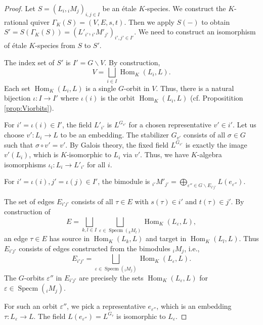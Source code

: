 \documentclass[a4paper,12pt,reqno]{amsart}
\DeclareMathOperator{\Specm}{\mathrm{Specm}}
\DeclareMathOperator{\Hom}{\mathrm{Hom}}
\theoremstyle{plain}
\theoremstyle{remark}
\begin{document}
\begin{proof}
    \smallskip
Let $S=(L_i, {}_iM_j)_{i,j\in I}$ be an \'etale $K$-species. We construct the $K$-rational quiver $\Gamma_K(S)=(V,E,s,t)$. Then we apply $S(-)$ to obtain $S' = S(\Gamma_K(S))=(L'_{i'},{}_{i'}M'_{j'})_{i',j'\in I'}$. We need to construct an isomorphism of \'etale $K$-species from $S$ to $S'$.

    \smallskip
     The index set of $S'$ is $I' = G\backslash V$. By construction,
    \[
    V=\bigsqcup\limits_{i\in I}\Hom_K(L_i,L).
    \]
    Each set $\Hom_K(L_i,L)$ is a single $G$-orbit in $V$. Thus, there is a natural bijection $\iota\colon I \to I'$ where $\iota(i)$ is the orbit $\Hom_K(L_i,L)$ (cf. Propositition \ref{prop:Viorbits}).

    \smallskip
     For $i'=\iota(i)\in I'$, the field $L'_{i'}$ is $L^{G_{v'}}$ for a chosen representative $v' \in i'$. Let us choose $v'\colon L_i \to L$ to be an embedding. The stabilizer $G_{v'}$ consists of all $\sigma\in G$ such that $\sigma\circ v' = v'$. By Galois theory, the fixed field $L^{G_{v'}}$ is exactly the image $v'(L_i)$, which is $K$-isomorphic to $L_i$ via $v'$. Thus, we have $K$-algebra isomorphisms $\iota_i\colon L_i \to L'_{i'}$ for all $i$.

    \smallskip
     For $i'=\iota(i), j'=\iota(j) \in I'$, the bimodule is ${}_{i'}M'_{j'} = \bigoplus_{\varepsilon'' \in G\backslash E_{i'j'}} L(e_{\varepsilon''})$.
    
    The set of edges $E_{i'j'}$ consists of all $\tau\in E$ with $s(\tau)\in i'$ and $t(\tau)\in j'$. By construction of
    \[
    E = \bigsqcup\limits_{k,l\in I}\bigsqcup\limits_{\varepsilon\in\Specm({}_kM_l)}\Hom_K(L_\varepsilon,L),
    \]
    an edge $\tau\in E$ has source in $\Hom_K(L_k,L)$ and target in $\Hom_K(L_l,L)$. Thus $E_{i'j'}$ consists of edges constructed from the bimodules ${}_iM_j$, i.e.,
    \[
    E_{i'j'} = \bigsqcup\limits_{\varepsilon\in\Specm({}_iM_j)}\Hom_K(L_\varepsilon,L).
    \]
    The $G$-orbits $\varepsilon''$ in $E_{i'j'}$ are precisely the sets $\Hom_K(L_\varepsilon,L)$ for $\varepsilon \in\Specm({}_iM_j)$.
    
    For such an orbit $\varepsilon''$, we pick a representative $e_{\varepsilon''}$, which is an embedding $\tau\colon L_\varepsilon \to L$. The field $L(e_{\varepsilon''}) = L^{G_{\tau}}$ is isomorphic to $L_\varepsilon$.
    

\end{proof}
\end{document}
